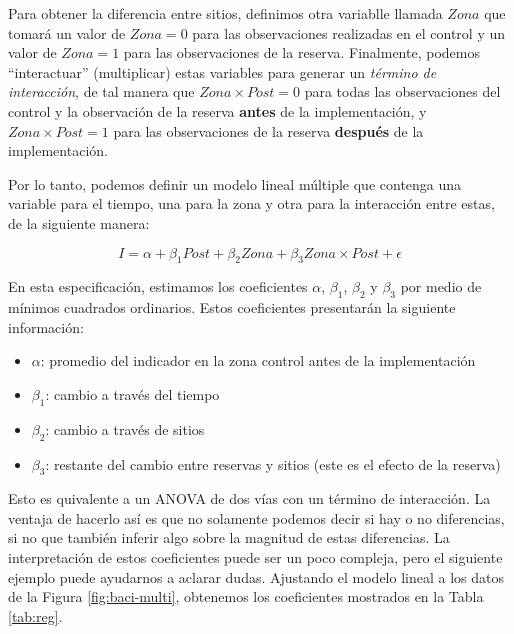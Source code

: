 \documentclass[]{krantz}
\providecommand{\tightlist}{%
  \setlength{\itemsep}{0pt}\setlength{\parskip}{0pt}}
\begin{document}
Para obtener la diferencia entre sitios, definimos otra variablle
llamada \(Zona\) que tomará un valor de \(Zona = 0\) para las
observaciones realizadas en el control y un valor de \(Zona = 1\) para
las observaciones de la reserva. Finalmente, podemos ``interactuar''
(multiplicar) estas variables para generar un \emph{término de
interacción}, de tal manera que \(Zona \times Post = 0\) para todas las
observaciones del control y la observación de la reserva \textbf{antes}
de la implementación, y \(Zona \times Post = 1\) para las observaciones
de la reserva \textbf{después} de la implementación.

Por lo tanto, podemos definir un modelo lineal múltiple que contenga una
variable para el tiempo, una para la zona y otra para la interacción
entre estas, de la siguiente manera:

\begin{equation} 
I = \alpha + \beta_1Post + \beta_2Zona + \beta_3Zona \times Post + \epsilon
\label{eq:did}
\end{equation}

En esta especificación, estimamos los coeficientes \(\alpha\),
\(\beta_1\), \(\beta_2\) y \(\beta_3\) por medio de mínimos cuadrados
ordinarios. Estos coeficientes presentarán la siguiente información:

\begin{itemize}
\tightlist
\item
  \(\alpha\): promedio del indicador en la zona control antes de la
  implementación
\item
  \(\beta_1\): cambio a través del tiempo
\item
  \(\beta_2\): cambio a través de sitios
\item
  \(\beta_3\): restante del cambio entre reservas y sitios (este es el
  efecto de la reserva)
\end{itemize}

Esto es quivalente a un ANOVA de dos vías con un término de interacción.
La ventaja de hacerlo así es que no solamente podemos decir si hay o no
diferencias, si no que también inferir algo sobre la magnitud de estas
diferencias. La interpretación de estos coeficientes puede ser un poco
compleja, pero el siguiente ejemplo puede ayudarnos a aclarar dudas.
Ajustando el modelo lineal a los datos de la Figura
\ref{fig:baci-multi}, obtenemos los coeficientes mostrados en la Tabla
\ref{tab:reg}.
\end{document}

